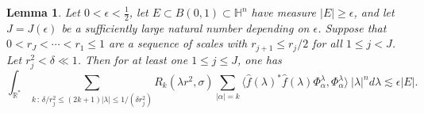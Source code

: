 \documentclass[11pt, reqno]{amsart}
\theoremstyle{plain}
\newcommand{\R}{\ensuremath{\mathbb{R_+}}}
\newtheorem{lemma}[theorem]{Lemma}
\theoremstyle{remark}
\theoremstyle{example}
\theoremstyle{definition}
\numberwithin{equation}{section}
\def\R{\mathbb{R}}
\def\H{\mathbb{H}}
\begin{document}
\begin{lemma}\label{Middle freq lemma} Let $0< \epsilon< \frac{1}{2}$, let $E \subset  B(0,1) \subset \H^n$ have measure $|E| \geq \epsilon$, and let $J=J(\epsilon)$ be a sufficiently large natural number depending on $\epsilon$. Suppose that $0 < r_{J} < \cdots < r_{1} \leq 1 $ are a sequence of scales with $r_{j+1} \leq r_{j}/2$ for all $1 \leq j < J$. Let $r_{j}^2 < \delta \ll 1$. Then for at least one $1 \leq j \leq J$, one has
\begin{equation}\label{middle freq estimate}
    \int_{\R^{*}} \sum_{k \, : \, \delta / r_{j}^{2}  \leq (2k+1) |\lambda |  \leq 1/ (\delta r_{j}^2) } R_{k}(\lambda r^{2},\sigma) \sum_{|\alpha|=k} \langle \hat{f}(\lambda)^{*} \hat{f}(\lambda) \Phi_{\alpha}^{\lambda},\Phi_{\alpha}^{\lambda} \rangle \ |\lambda|^n d\lambda \lesssim \epsilon |E|.
\end{equation}
\end{lemma}
\end{document}
